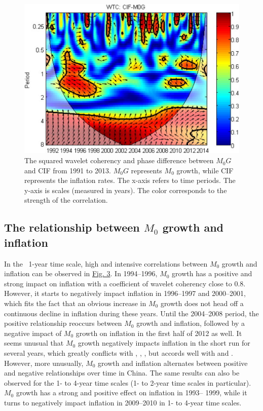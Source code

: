 \documentclass[a4paper,fleqn]{cas-sc}
\begin{document}
\begin{figure}[h]\label{fig:3}
    \centering
    \includegraphics[]{image/3.jpg}
    \caption{The squared wavelet coherency and phase difference between $M_0G$ and CIF from 1991 to 2013. $M_0G$ represents $M_0$  growth, while CIF represents the inflation rates. The x-axis refers to time periods. The y-axis is scales (measured in years). The color corresponds to the strength of the correlation.}
\end{figure}

\subsection{The relationship between \boldmath $M_0$ growth and inflation}
In the ~1-year time scale, high and intensive correlations between $M_0$ growth and inflation can be observed in \hyperref[fig:3]{Fig. 3}. In 1994–1996, $M_0$ growth has a positive and strong impact on inflation with a coefficient of wavelet coherency close to $0.8$. However, it starts to negatively impact inflation in 1996–1997 and 2000–2001, which fits the fact that an obvious increase in $M_0$ growth does not head off a continuous decline in inflation during these years. Until the 2004–2008 period, the positive relationship reoccurs between $M_0$ growth and inflation, followed by a negative impact of $M_0$ growth on inflation in the first half of 2012 as well. It seems unusual that $M_0$ growth negatively impacts inflation in the short run for several years, which greatly conflicts with \cite{xie2004}, \cite{roffia2007}, \cite{Zhang2012}, \cite{Yu2012} but accords well with \cite{shuai2002} and \cite{wu2002}. However, more unusually, $M_0$ growth and inflation alternates between positive and negative relationships over time in China. The same results can also be observed for the 1- to 4-year time scales (1- to 2-year time scales in particular). $M_0$ growth has a strong and positive effect on inflation in 1993– 1999, while it turns to negatively impact inflation in 2009–2010 in 1- to 4-year time scales.
\end{document}
